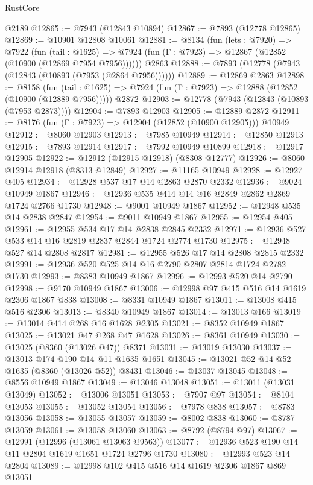 \begin{lexlean}{RustCore}
\begin{coremodule}
    @2189
@12865 := @7943 (@12843 @10894)
@12867 := @7893 (@12778 @12865)
@12869 := @10901 @12808 @10061
@12881 := @8134
    (fun (lets : @7920) =>
    @7922
      (fun (tail : @1625) =>
      @7924 (fun (Γ : @7923) => @12867 (@12852 (@10900 (@12869 @7954 @7956))))))
    @2863
@12888 := @7893 (@12778 (@7943 (@12843 (@10893 (@7953 (@2864 @7956))))))
@12889 := @12869 @2863
@12898 := @8158
    (fun (tail : @1625) => @7924 (fun (Γ : @7923) => @12888 (@12852 (@10900 (@12889 @7956)))))
    @2872
@12903 := @12778 (@7943 (@12843 (@10893 (@7953 @2873))))
@12904 := @7893 @12903
@12905 := @12889 @2872
@12911 := @8176 (fun (Γ : @7923) => @12904 (@12852 (@10900 @12905))) @10949
@12912 := @8060 @12903
@12913 := @7985 @10949
@12914 := @12850 @12913
@12915 := @7893 @12914
@12917 := @7992 @10949 @10899
@12918 := @12917 @12905
@12922 := @12912 (@12915 @12918) (@8308 @12777)
@12926 := @8060 @12914 @12918 (@8313 @12849)
@12927 := @11165 @10949
@12928 := @12927 @405
@12934 := @12928 @537 @17 @14 @2863 @2870 @2332
@12936 := @9024 @10949 @1867
@12946 := @12936 @535 @414 @14 @16 @2849 @2862 @2869 @1724 @2766 @1730
@12948 := @9001 @10949 @1867
@12952 := @12948 @535 @14 @2838 @2847
@12954 := @9011 @10949 @1867
@12955 := @12954 @405
@12961 := @12955 @534 @17 @14 @2838 @2845 @2332
@12971 := @12936 @527 @533 @14 @16 @2819 @2837 @2844 @1724 @2774 @1730
@12975 := @12948 @527 @14 @2808 @2817
@12981 := @12955 @526 @17 @14 @2808 @2815 @2332
@12991 := @12936 @520 @525 @14 @16 @2790 @2807 @2814 @1724 @2782 @1730
@12993 := @8383 @10949 @1867
@12996 := @12993 @520 @14 @2790
@12998 := @9170 @10949 @1867
@13006 := @12998 @97 @415 @516 @14 @1619 @2306 @1867 @838
@13008 := @8331 @10949 @1867
@13011 := @13008 @415 @516 @2306
@13013 := @8340 @10949 @1867
@13014 := @13013 @166
@13019 := @13014 @414 @268 @16 @1628 @2305
@13021 := @8352 @10949 @1867
@13025 := @13021 @47 @268 @47 @1628
@13026 := @8361 @10949
@13030 := @13025 (@8360 (@13026 @47)) @8371
@13031 := @13019 @13030
@13037 := @13013 @174 @190 @14 @11 @1635 @1651
@13045 := @13021 @52 @14 @52 @1635 (@8360 (@13026 @52)) @8431
@13046 := @13037 @13045
@13048 := @8556 @10949 @1867
@13049 := @13046 @13048
@13051 := @13011 (@13031 @13049)
@13052 := @13006 @13051
@13053 := @7907 @97
@13054 := @8104 @13053
@13055 := @13052 @13054
@13056 := @7978 @838
@13057 := @8783 @13056
@13058 := @13055 @13057
@13059 := @8002 @838
@13060 := @8787 @13059
@13061 := @13058 @13060
@13063 := @8792 (@8794 @97)
@13067 := @12991 (@12996 (@13061 @13063 @9563))
@13077 := @12936 @523 @190 @14 @11 @2804 @1619 @1651 @1724 @2796 @1730
@13080 := @12993 @523 @14 @2804
@13089 := @12998 @102 @415 @516 @14 @1619 @2306 @1867 @869 @13051

\end{coremodule}
\end{lexlean}
